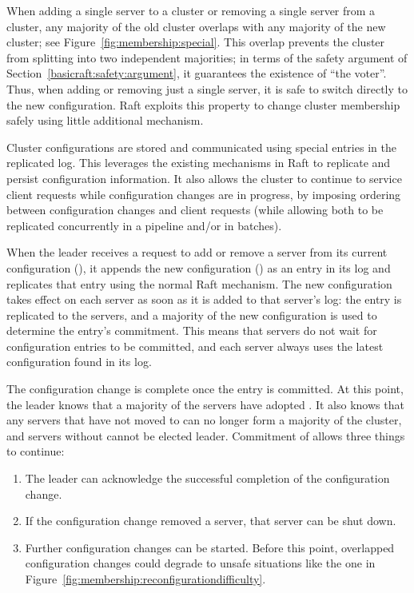 When adding a single server to a cluster or removing a single server
from a cluster, any majority of the old cluster overlaps with any
majority of the new cluster; see Figure~\ref{fig:membership:special}.
This overlap prevents the cluster from splitting into two independent
majorities; in terms of the safety argument of
Section~\ref{basicraft:safety:argument}, it guarantees the existence of
``the voter''. Thus, when adding or removing just a single server, it is
safe to switch directly to the new configuration. Raft exploits this
property to change cluster membership safely using little additional
mechanism.

Cluster configurations are stored and communicated using special entries
in the replicated log.
This leverages the existing mechanisms in Raft to
replicate and persist configuration information.
It also allows the cluster to continue to service
client requests while configuration changes are in progress,
by imposing ordering between
configuration changes and client requests (while allowing both to be
replicated concurrently in a pipeline and/or in batches).

When the leader receives a request to add or remove a server from its
current configuration (\cold{}), it appends the new configuration
(\cnew{}) as an entry in its log and replicates that entry using the
normal Raft mechanism. The new configuration takes effect on each server
as soon as it is added to that server's log: the \cnew{} entry is
replicated to the \cnew{} servers, and a majority of the new
configuration is used to determine the \cnew{} entry's commitment. This
means that servers do not wait for configuration entries to be
committed, and each server always uses the latest configuration found in
its log.

The configuration change is complete once the \cnew{} entry is
committed. At this point, the leader knows that a majority of the
\cnew{} servers have adopted \cnew{}. It also knows that any servers
that have not moved to \cnew{} can no longer form a majority of the
cluster, and servers without \cnew{} cannot be elected leader.
Commitment of \cnew{} allows three things to continue:
%
\begin{enumerate}
%
\item The leader can acknowledge the successful completion of the
configuration change.
%
\item If the configuration change removed a server, that server can be
shut down.
%
\item Further configuration changes can be started. Before this point,
overlapped configuration changes could degrade to unsafe situations
like the one in Figure~\ref{fig:membership:reconfigurationdifficulty}.
%
\end{enumerate}

